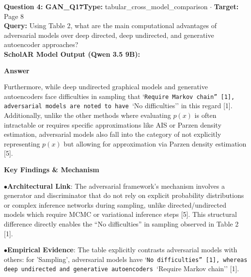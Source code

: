 \documentclass[10pt,a4paper]{article}
\begin{document}
\vspace{4pt}
\begin{tcolorbox}[questionbox]
{\noindent\bfseries\large\color{navy} Question 4: GAN\_Q17}\hfill {\footnotesize\color{darkteal}\textbf{Type:} tabular\_cross\_model\_comparison $\cdot$ \textbf{Target:} Page 8}\\[4pt]
{\noindent\bfseries\color{accentblue} Query: } Using Table 2, what are the main computational advantages of adversarial models over deep directed, deep undirected, and generative autoencoder approaches?\\[6pt]
{\noindent\bfseries\color{navy} ScholAR Model Output (Qwen 3.5 9B):}\\[2pt]
{\small \noindent \textbf{Answer}\par\vspace{3pt}Furthermore, while deep undirected graphical models and generative autoencoders face difficulties in sampling that `\texttt{Require Markov chain'' [1], adversarial models are noted to have }`No difficulties'' in this regard [1]. Additionally, unlike the other methods where evaluating $p(x)$ is often intractable or requires specific approximations like AIS or Parzen density estimation, adversarial models also fall into the category of not explicitly representing $p(x)$ but allowing for approximation via Parzen density estimation [5].\par\vspace{3pt}\noindent \textbf{Key Findings \& Mechanism}\par\vspace{3pt}\noindent\hspace*{8pt}$\bullet$\hspace*{4pt}\textbf{Architectural Link}: The adversarial framework's mechanism involves a generator and discriminator that do not rely on explicit probability distributions or complex inference networks during sampling, unlike directed/undirected models which require MCMC or variational inference steps [5]. This structural difference directly enables the ``No difficulties'' in sampling observed in Table 2 [1].\par\vspace{3pt}\noindent\hspace*{8pt}$\bullet$\hspace*{4pt}\textbf{Empirical Evidence}: The table explicitly contrasts adversarial models with others: for 'Sampling', adversarial models have `\texttt{No difficulties'' [1], whereas deep undirected and generative autoencoders }`Require Markov chain'' [1].}\\[6pt]

\end{tcolorbox}
\end{document}
